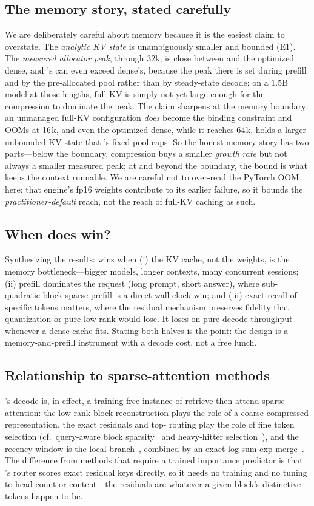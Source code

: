 \subsection{The memory story, stated carefully}
We are deliberately careful about memory because it is the easiest claim to overstate. The
\emph{analytic KV state} is unambiguously smaller and bounded (E1). The \emph{measured allocator
peak}, through $32$k, is close between \dkv{} and the optimized dense, and \dkv{}'s can even
exceed dense's, because the peak there is set during prefill and by the pre-allocated pool rather
than by steady-state decode; on a $1.5$B model at those lengths, full KV is simply not yet large
enough for the compression to dominate the peak. The claim sharpens at the memory boundary: an
unmanaged full-KV configuration \emph{does} become the binding constraint and OOMs at $16$k, and
even the optimized dense, while it reaches $64$k, holds a larger unbounded KV state that
\dkv{}'s fixed pool caps. So the honest memory story has two parts---below the boundary,
compression buys a smaller \emph{growth rate} but not always a smaller measured peak; at and beyond
the boundary, the bound is what keeps the context runnable. We are careful not to over-read the
PyTorch OOM here: that engine's fp16 weights contribute to its earlier failure, so it bounds the
\emph{practitioner-default} reach, not the reach of full-KV caching as such.

\subsection{When does \dkv{} win?}
Synthesizing the results: \dkv{} wins when (i) the KV cache, not the weights, is the memory
bottleneck---bigger models, longer contexts, many concurrent sessions; (ii) prefill dominates the
request (long prompt, short answer), where sub-quadratic block-sparse prefill is a direct
wall-clock win; and (iii) exact recall of specific tokens matters, where the residual mechanism
preserves fidelity that quantization or pure low-rank would lose. It loses on pure decode
throughput whenever a dense cache fits. Stating both halves is the point: the design is a
memory-and-prefill instrument with a decode cost, not a free lunch.

\subsection{Relationship to sparse-attention methods}
\dkv{}'s decode is, in effect, a training-free instance of retrieve-then-attend sparse
attention: the low-rank block reconstruction plays the role of a coarse compressed representation,
the exact residuals and top-\topk{} routing play the role of fine token selection (cf.\ query-aware
block sparsity~\cite{tang2024quest} and heavy-hitter selection~\cite{zhang2023h2o}), and the recency
window is the local branch~\cite{xiao2024streamingllm}, combined by an exact log-sum-exp
merge~\cite{dao2022flashattention}. The difference from methods
that require a trained importance predictor is that \dkv{}'s router scores exact residual keys
directly, so it needs no training and no tuning to head count or content---the residuals are
whatever a given block's distinctive tokens happen to be.
